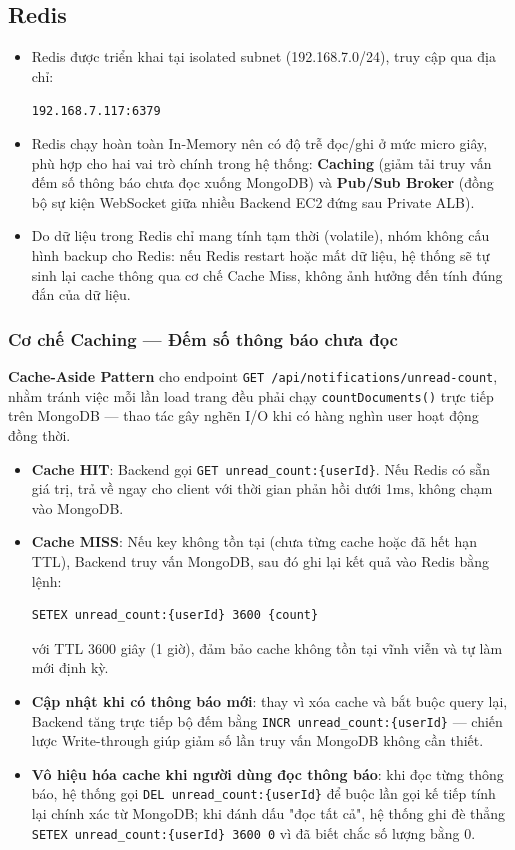 \documentclass[12pt, a4paper]{article}
\begin{document}
\subsection{Redis}
\begin{itemize}
\item Redis được triển khai tại isolated subnet (192.168.7.0/24), truy cập qua địa chỉ:
\begin{center}
\texttt{192.168.7.117:6379}
\end{center}
\item Redis chạy hoàn toàn In-Memory nên có độ trễ đọc/ghi ở mức micro giây, phù hợp cho hai vai trò chính trong hệ thống: \textbf{Caching} (giảm tải truy vấn đếm số thông báo chưa đọc xuống MongoDB) và \textbf{Pub/Sub Broker} (đồng bộ sự kiện WebSocket giữa nhiều Backend EC2 đứng sau Private ALB).
\item Do dữ liệu trong Redis chỉ mang tính tạm thời (volatile), nhóm không cấu hình backup cho Redis: nếu Redis restart hoặc mất dữ liệu, hệ thống sẽ tự sinh lại cache thông qua cơ chế Cache Miss, không ảnh hưởng đến tính đúng đắn của dữ liệu.
\end{itemize}

\subsubsection{Cơ chế Caching — Đếm số thông báo chưa đọc}
 \textbf{Cache-Aside Pattern} cho endpoint \texttt{GET /api/notifications/unread-count}, nhằm tránh việc mỗi lần load trang đều phải chạy \texttt{countDocuments()} trực tiếp trên MongoDB — thao tác gây nghẽn I/O khi có hàng nghìn user hoạt động đồng thời.

\begin{itemize}
\item \textbf{Cache HIT}: Backend gọi \texttt{GET unread\_count:\{userId\}}. Nếu Redis có sẵn giá trị, trả về ngay cho client với thời gian phản hồi dưới 1ms, không chạm vào MongoDB.
\item \textbf{Cache MISS}: Nếu key không tồn tại (chưa từng cache hoặc đã hết hạn TTL), Backend truy vấn MongoDB, sau đó ghi lại kết quả vào Redis bằng lệnh:
\begin{lstlisting}
SETEX unread_count:{userId} 3600 {count}
\end{lstlisting}
với TTL 3600 giây (1 giờ), đảm bảo cache không tồn tại vĩnh viễn và tự làm mới định kỳ.
\item \textbf{Cập nhật khi có thông báo mới}: thay vì xóa cache và bắt buộc query lại, Backend tăng trực tiếp bộ đếm bằng \texttt{INCR unread\_count:\{userId\}} — chiến lược Write-through giúp giảm số lần truy vấn MongoDB không cần thiết.
\item \textbf{Vô hiệu hóa cache khi người dùng đọc thông báo}: khi đọc từng thông báo, hệ thống gọi \texttt{DEL unread\_count:\{userId\}} để buộc lần gọi kế tiếp tính lại chính xác từ MongoDB; khi đánh dấu "đọc tất cả", hệ thống ghi đè thẳng \texttt{SETEX unread\_count:\{userId\} 3600 0} vì đã biết chắc số lượng bằng 0.
\end{itemize}
\end{document}
